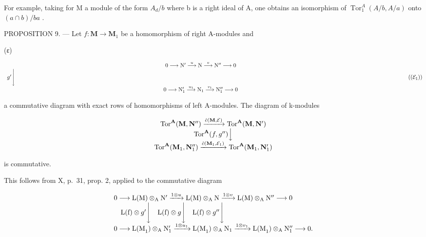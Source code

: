 For example, taking for M a module of the form \(A_{d}/b\) where b is a right ideal of A, one obtains an isomorphism of \(\operatorname{Tor}_{1}^{A}(A/b, A/a)\) onto \((a \cap b)/ba\) .

PROPOSITION 9. --- Let \(f: \mathbf{M} \to \mathbf{M}_{1}\) be a homomorphism of right A-modules and

(ε)

\[
\begin{array}{c} 0 \longrightarrow \mathrm{N} ^ {\prime} \stackrel {{u}} {{\longrightarrow}} \mathrm{N} \stackrel {{v}} {{\longrightarrow}} \mathrm{N} ^ {\prime \prime} \longrightarrow 0 \\ g ^ {\prime} \Biggl \downarrow \qquad \qquad \qquad \qquad \qquad \qquad \qquad \qquad \qquad \qquad \qquad \qquad \qquad \qquad \qquad \qquad \qquad \qquad \qquad \qquad \qquad \qquad \qquad \qquad \qquad \qquad \qquad \qquad \qquad \qquad \qquad \qquad \qquad \qquad \\ 0 \longrightarrow \mathrm{N} _ {1} ^ {\prime} \stackrel {{u _ {1}}} {{\longrightarrow}} \mathrm{N} _ {1} \stackrel {{v _ {1}}} {{\longrightarrow}} \mathrm{N} _ {1} ^ {\prime \prime} \longrightarrow 0 \end{array}\tag{$(\mathcal{E}_1)$}
\]

a commutative diagram with exact rows of homomorphisms of left A-modules. The diagram of k-modules

\[
\begin{array}{c} \operatorname{Tor} ^ {\mathbf {A}} (\mathbf {M}, \mathbf {N} ^ {\prime \prime}) \xrightarrow {\hat {c} (\mathbf {M} , \mathcal {E})} \operatorname{Tor} ^ {\mathbf {A}} (\mathbf {M}, \mathbf {N} ^ {\prime}) \\ \operatorname{Tor} ^ {\mathbf {A}} (f, g ^ {\prime \prime}) \Big \downarrow \\ \operatorname{Tor} ^ {\mathbf {A}} (\mathbf {M} _ {1}, \mathbf {N} _ {1} ^ {\prime \prime}) \xrightarrow {\hat {c} (\mathbf {M} _ {1} , \mathcal {E} _ {1})} \operatorname{Tor} ^ {\mathbf {A}} (\mathbf {M} _ {1}, \mathbf {N} _ {1} ^ {\prime}) \end{array}
\]

is commutative.

This follows from X, p.~31, prop. 2, applied to the commutative diagram

\[
\begin{array}{l} 0 \longrightarrow \mathrm{L(M)} \otimes_ {\mathrm{A}} \mathrm{N} ^ {\prime} \xrightarrow {1 \otimes u} \mathrm{L(M)} \otimes_ {\mathrm{A}} \mathrm{N} \xrightarrow {1 \otimes v} \mathrm{L(M)} \otimes_ {\mathrm{A}} \mathrm{N} ^ {\prime \prime} \longrightarrow 0 \\ \quad \mathrm{L(f)} \otimes g ^ {\prime} \Biggl \downarrow \quad \mathrm{L(f)} \otimes g \Biggl \downarrow \quad \mathrm{L(f)} \otimes g ^ {\prime \prime} \Biggl \downarrow \\ 0 \longrightarrow \mathrm{L(M} _ {1}) \otimes_ {\mathrm{A}} \mathrm{N} _ {1} ^ {\prime} \xrightarrow {1 \otimes u _ {1}} \mathrm{L(M} _ {1}) \otimes_ {\mathrm{A}} \mathrm{N} _ {1} \xrightarrow {1 \otimes v _ {1}} \mathrm{L(M} _ {1}) \otimes_ {\mathrm{A}} \mathrm{N} _ {1} ^ {\prime \prime} \longrightarrow 0. \end{array}
\]

